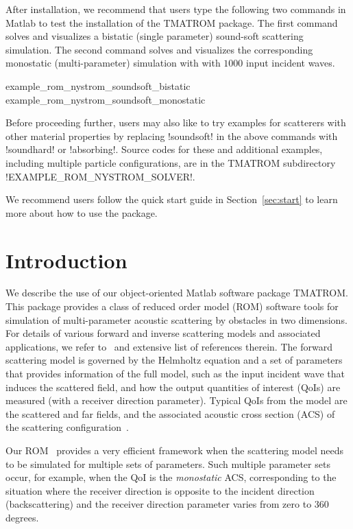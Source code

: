 \documentclass[12pt,letterpaper,final]{article}
\begin{document}
After installation, 
we recommend that users type the following two
commands in  Matlab
to test the installation of the TMATROM package. 
The  first command solves and visualizes a bistatic (single parameter) 
sound-soft scattering simulation.
The second command solves and visualizes the corresponding 
monostatic (multi-parameter)
simulation with
with $1000$ input incident waves.
\begin{matlab}
example_rom_nystrom_soundsoft_bistatic
example_rom_nystrom_soundsoft_monostatic
\end{matlab}
Before proceeding further, users may also like to try  
examples for scatterers with other material properties
by  replacing
!soundsoft! in the above commands with !soundhard! or !absorbing!. Source codes for these 
and additional examples, including multiple particle configurations,  are in the 
TMATROM subdirectory !EXAMPLE_ROM_NYSTROM_SOLVER!.

We recommend users follow
the quick start guide in Section~\ref{sec:start}
to learn more about how to use the package.



\tableofcontents




\section{Introduction}

We describe the use of our object-oriented Matlab 
software package TMATROM. 
This package provides a class of reduced order model (ROM) software tools for  simulation of
multi-parameter
acoustic scattering by obstacles in two dimensions. For details of various forward and inverse 
scattering models and associated applications, we refer to~\cite{colton:inverse} and extensive list of references therein. The forward scattering model is governed by the 
Helmholtz equation and a  set of parameters  that provides information of the full model,
such as the input incident wave that induces 
the scattered field, and how the output
quantities of interest (QoIs) are measured (with a receiver direction parameter). Typical QoIs 
from the model are the scattered and far fields, and the associated acoustic cross section (ACS) of
the scattering configuration~\cite{colton:inverse}. 

Our ROM~\cite{gh:tmat2d, ghh:tmatrix} provides  a
very efficient framework when the scattering model needs to be simulated for 
multiple sets of  parameters.   
Such multiple parameter sets  occur, for example,
when the QoI is the {\em monostatic}  ACS,  corresponding to the situation where the receiver direction
is opposite to the incident direction (backscattering) and the receiver direction parameter varies from
zero to 360 degrees. 
\end{document}

